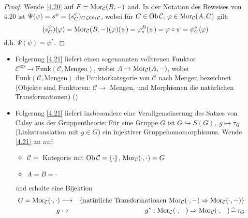 \begin{proof}
	Wende \ref{4.20} auf $F= \text{Mor}_{\mathcal{C}}(B,-)$ and. In der Notation des Beweises von 4.20 ist $\Psi(\psi) = s^\psi = (s_C^\psi)_{C\in \text{Ob}\,\mathcal{C}}$, wobei für $C\in \text{Ob}\,\mathcal{C}, \, \varphi \in \text{Mor}_{\mathcal{C}}(A,C)$ gilt: 
	$$(s_C^\psi)(\varphi) = \text{Mor}_{\mathcal{C}}(B,-)(\varphi)(\psi) = \varphi_*^B(\psi) = \varphi \circ \psi = \psi^*_C(\varphi)$$
	d.h. $\Psi(\psi) = \psi^*$.
\end{proof}
\begin{anm}
	\begin{itemize}
		\item Folgerung \ref{4.21} liefert einen sogenannten volltreuen Funktor $\mathcal{C}^\text{op} \to \text{Funk}(\mathcal{C}, \text{Mengen})$, wobei $A\mapsto \text{Mor}_{\mathcal{C}}(A,-)$, wobei $\text{Funk}(\mathcal{C}, \text{Mengen})$ die Funktorkategorie von $\mathcal{C}$ nach Mengen bezeichnet (Objekte sind Funktoren: $\mathcal{C} \to $ Mengen, und Morphismen die natürlichen Transformationen) ()
		\item Folgerung \ref{4.21} liefert insbesondere eine Verallgemeinerung des Satzes von Caley aus der Gruppentheorie: Für eine Gruppe $G$ ist $G \hookrightarrow S(G), \; g \mapsto \tau_G$ (Linkstranslation mit $g\in G$) ein injektiver Gruppehomomorphismus. Wende \ref{4.21} an auf: \begin{itemize}
			\item $\mathcal{C} = $ Kategorie mit $\text{Ob}\,\mathcal{C} = \{ \cdot  \}$, $\text{Mor}_{\mathcal{C}}( \cdot , \cdot ) = G$
			\item $A=B= \cdot $
		\end{itemize}
	und erhalte eine Bijektion 
	\begin{eqnarray*}
		G= \text{Mor}_{\mathcal{C}}( \cdot, \cdot )  & \longrightarrow & \{\text{natürliche Transformationen } \text{Mor}_{\mathcal{C}}( \cdot, -)  \Rightarrow \text{Mor}_{\mathcal{C}}(\cdot, -) \}\\
		g & \mapsto & g^*: \text{Mor}_{\mathcal{C}}( \cdot, -) \Rightarrow \text{Mor}_{\mathcal{C}}( \cdot, -) \, \widehat{=} \, \tau_G
	\end{eqnarray*}
	\end{itemize}
\end{anm}
\newpage
